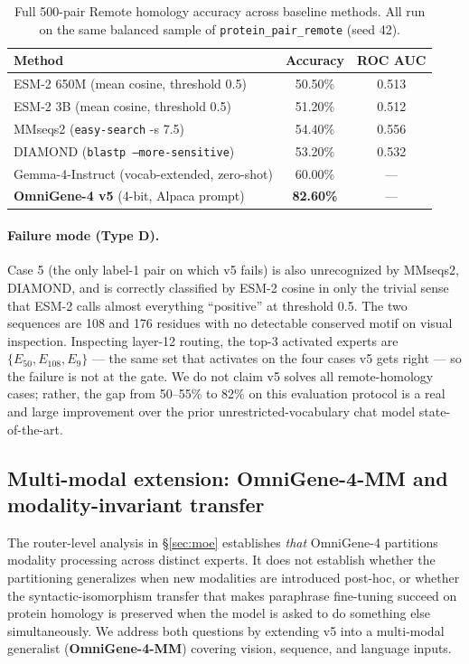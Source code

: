 \documentclass[11pt]{article}
\begin{document}
\begin{table}[H]
\centering
\small
\caption{Full 500-pair Remote homology accuracy across baseline methods. All run on the same balanced sample of \texttt{protein\_pair\_remote} (seed 42).}
\label{tab:full_baseline}
\begin{tabular}{lcc}
\toprule
\textbf{Method} & \textbf{Accuracy} & \textbf{ROC AUC} \\
\midrule
ESM-2 650M (mean cosine, threshold 0.5)   & 50.50\% & 0.513 \\
ESM-2 3B (mean cosine, threshold 0.5)     & 51.20\% & 0.512 \\
MMseqs2 (\texttt{easy-search} -s 7.5)     & 54.40\% & 0.556 \\
DIAMOND (\texttt{blastp --more-sensitive})& 53.20\% & 0.532 \\
Gemma-4-Instruct (vocab-extended, zero-shot) & 60.00\% & --- \\
\midrule
\textbf{OmniGene-4 v5} (4-bit, Alpaca prompt) & \textbf{82.60\%} & --- \\
\bottomrule
\end{tabular}
\end{table}

\paragraph{Failure mode (Type D).}
Case 5 (the only label-1 pair on which v5 fails) is also unrecognized by MMseqs2, DIAMOND, and is correctly classified by ESM-2 cosine in only the trivial sense that ESM-2 calls almost everything ``positive'' at threshold 0.5. The two sequences are 108 and 176 residues with no detectable conserved motif on visual inspection. Inspecting layer-12 routing, the top-3 activated experts are $\{E_{50}, E_{108}, E_9\}$ --- the same set that activates on the four cases v5 gets right --- so the failure is not at the gate. We do not claim v5 solves all remote-homology cases; rather, the gap from 50--55\% to 82\% on this evaluation protocol is a real and large improvement over the prior unrestricted-vocabulary chat model state-of-the-art.

\subsection{Multi-modal extension: OmniGene-4-MM and modality-invariant transfer}
\label{sec:mm}

The router-level analysis in \S\ref{sec:moe} establishes \emph{that} OmniGene-4 partitions modality processing across distinct experts. It does not establish whether the partitioning generalizes when new modalities are introduced post-hoc, or whether the syntactic-isomorphism transfer that makes paraphrase fine-tuning succeed on protein homology is preserved when the model is asked to do something else simultaneously. We address both questions by extending v5 into a multi-modal generalist (\textbf{OmniGene-4-MM}) covering vision, sequence, and language inputs.
\end{document}
